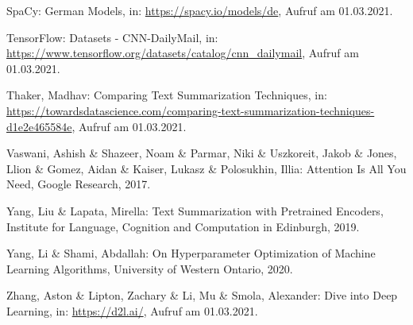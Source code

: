 \begin{thebibliography}{50}
SpaCy: German Models, in: \url{https://spacy.io/models/de}, Aufruf am 01.03.2021.

TensorFlow: Datasets - CNN-DailyMail, in: \url{https://www.tensorflow.org/datasets/catalog/cnn_dailymail}, Aufruf am 01.03.2021.

Thaker, Madhav: Comparing Text Summarization Techniques, in: \url{https://towardsdatascience.com/comparing-text-summarization-techniques-d1e2e465584e}, Aufruf am 01.03.2021.

Vaswani, Ashish \& Shazeer, Noam \& Parmar, Niki \& Uszkoreit, Jakob \& Jones, Llion \& Gomez, Aidan \& Kaiser, Lukasz \& Polosukhin, Illia: Attention Is All You Need, Google Research, 2017.

Yang, Liu \& Lapata, Mirella: Text Summarization with Pretrained Encoders, Institute for Language, Cognition and Computation in Edinburgh, 2019.

Yang, Li \& Shami, Abdallah: On Hyperparameter Optimization of Machine Learning Algorithms, University of Western Ontario, 2020.

Zhang, Aston \& Lipton, Zachary \& Li, Mu \& Smola, Alexander: Dive into Deep Learning, in: \url{https://d2l.ai/}, Aufruf am 01.03.2021.

\end{thebibliography}
